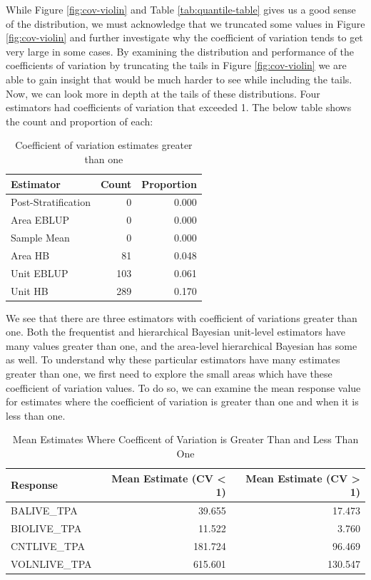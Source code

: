 \documentclass[12pt,twoside]{reedthesis}
\begin{document}
While Figure \ref{fig:cov-violin} and Table \ref{tab:quantile-table} gives us a good sense of the distribution, we must acknowledge that we truncated some values in Figure \ref{fig:cov-violin} and further investigate why the coefficient of variation tends to get very large in some cases. By examining the distribution and performance of the coefficients of variation by truncating the tails in Figure \ref{fig:cov-violin} we are able to gain insight that would be much harder to see while including the tails. Now, we can look more in depth at the tails of these distributions. Four estimators had coefficients of variation that exceeded 1. The below table shows the count and proportion of each:
\begin{longtable}[t]{lrr}
\caption{\label{tab:over-one}Coefficient of variation estimates greater than one}\\
\toprule
Estimator & Count & Proportion\\
\midrule
Post-Stratification & 0 & 0.000\\
Area EBLUP & 0 & 0.000\\
Sample Mean & 0 & 0.000\\
Area HB & 81 & 0.048\\
Unit EBLUP & 103 & 0.061\\
\addlinespace
Unit HB & 289 & 0.170\\
\bottomrule
\end{longtable}
We see that there are three estimators with coefficient of variations greater than one. Both the frequentist and hierarchical Bayesian unit-level estimators have many values greater than one, and the area-level hierarchical Bayesian has some as well. To understand why these particular estimators have many estimates greater than one, we first need to explore the small areas which have these coefficient of variation values. To do so, we can examine the mean response value for estimates where the coefficient of variation is greater than one and when it is less than one.
\begin{longtable}[t]{lrr}
\caption{\label{tab:covg1l1}Mean Estimates Where Coefficent of Variation is Greater Than and Less Than One}\\
\toprule
Response & Mean Estimate (CV < 1) & Mean Estimate (CV > 1)\\
\midrule
BALIVE\_TPA & 39.655 & 17.473\\
BIOLIVE\_TPA & 11.522 & 3.760\\
CNTLIVE\_TPA & 181.724 & 96.469\\
VOLNLIVE\_TPA & 615.601 & 130.547\\
\bottomrule
\end{longtable}
\end{document}
